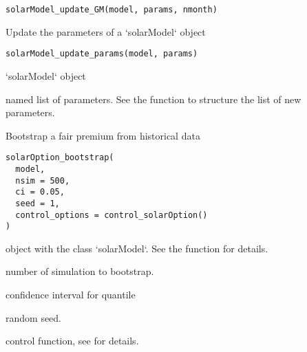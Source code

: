\documentclass[a4paper]{book}
\begin{document}
%
\begin{Usage}
\begin{verbatim}
solarModel_update_GM(model, params, nmonth)
\end{verbatim}
\end{Usage}
%
\begin{Description}\relax
Update the parameters of a `solarModel` object
\end{Description}
%
\begin{Usage}
\begin{verbatim}
solarModel_update_params(model, params)
\end{verbatim}
\end{Usage}
%
\begin{Arguments}
\begin{ldescription}
\item[\code{model}] `solarModel` object

\item[\code{params}] named list of parameters. See the function  to structure the list of new parameters.
\end{ldescription}
\end{Arguments}
%
\begin{Description}\relax
Bootstrap a fair premium from historical data
\end{Description}
%
\begin{Usage}
\begin{verbatim}
solarOption_bootstrap(
  model,
  nsim = 500,
  ci = 0.05,
  seed = 1,
  control_options = control_solarOption()
)
\end{verbatim}
\end{Usage}
%
\begin{Arguments}
\begin{ldescription}
\item[\code{model}] object with the class `solarModel`. See the function  for details.

\item[\code{nsim}] number of simulation to bootstrap.

\item[\code{ci}] confidence interval for quantile

\item[\code{seed}] random seed.

\item[\code{control\_options}] control function, see  for details.
\end{ldescription}
\end{Arguments}
\end{document}
